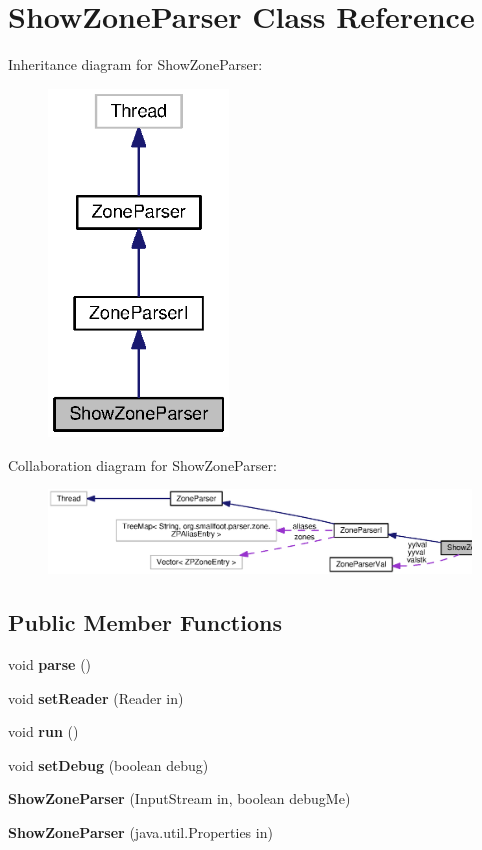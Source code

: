 \section{Show\+Zone\+Parser Class Reference}
\label{classorg_1_1smallfoot_1_1parser_1_1zone_1_1ShowZoneParser}


Inheritance diagram for Show\+Zone\+Parser\+:\nopagebreak
\begin{figure}[H]
\begin{center}
\leavevmode
\includegraphics[width=136pt]{classorg_1_1smallfoot_1_1parser_1_1zone_1_1ShowZoneParser__inherit__graph}
\end{center}
\end{figure}


Collaboration diagram for Show\+Zone\+Parser\+:\nopagebreak
\begin{figure}[H]
\begin{center}
\leavevmode
\includegraphics[width=350pt]{classorg_1_1smallfoot_1_1parser_1_1zone_1_1ShowZoneParser__coll__graph}
\end{center}
\end{figure}
\subsection*{Public Member Functions}
\begin{DoxyCompactItemize}
\item 
void {\bf parse} ()
\item 
void {\bf set\+Reader} (Reader in)
\item 
void {\bf run} ()
\item 
void {\bf set\+Debug} (boolean debug)
\item 
{\bf Show\+Zone\+Parser} (Input\+Stream in, boolean debug\+Me)
\item 
{\bf Show\+Zone\+Parser} (java.\+util.\+Properties in)
\end{DoxyCompactItemize}
